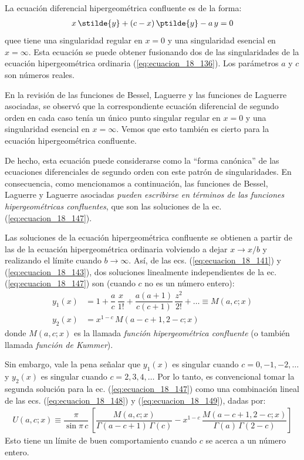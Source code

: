 La ecuación diferencial hipergeométrica confluente es de la forma:
\begin{align}
x \, \stilde{y} + (c - x) \, \ptilde{y} - a \, y = 0
\label{eq:ecuacion_18_147}
\end{align}
quee tiene una singularidad regular en $x = 0$ y una singularidad esencial en $x = \infty$. Esta ecuación se puede obtener fusionando dos de las singularidades de la ecuación hipergeométrica ordinaria (\ref{eq:ecuacion_18_136}). Los parámetros $a$ y $c$ son números reales.
\par
En la revisión de las funciones de Bessel, Laguerre y las funciones de Laguerre asociadas, se observó que la correspondiente ecuación diferencial de segundo orden en cada caso tenía un único punto singular regular en $x = 0$ y una singularidad esencial en $x = \infty$. Vemos que esto también es cierto para la ecuación hipergeométrica confluente.
\par
De hecho, esta ecuación puede considerarse como la \enquote{forma canónica} de las ecuaciones diferenciales de segundo orden con este patrón de singularidades. En consecuencia, como mencionamos a continuación, las funciones de Bessel, Laguerre y Laguerre asociadas \emph{pueden escribirse en términos de las funciones hipergeométricas confluentes}, que son las soluciones de la ec. (\ref{eq:ecuacion_18_147}).
\par
Las soluciones de la ecuación hipergeométrica confluente se obtienen a partir de las de la ecuación hipergeométrica ordinaria volviendo a dejar $x \to x/b$ y realizando el límite cuando $b \to \infty$. Así, de las ecs. (\ref{eq:ecuacion_18_141}) y (\ref{eq:ecuacion_18_143}), dos soluciones linealmente independientes de la ec. (\ref{eq:ecuacion_18_147}) son (cuando $c$ no es un número entero):
\begin{align}
y_{1} (x) &= 1 + \dfrac{a}{c} \, \dfrac{x}{1!} + \dfrac{a (a + 1)}{c (c + 1)} \, \dfrac{z^{2}}{2!} + \ldots \equiv M (a, c; x) \label{eq:ecuacion_18_148} \\[0.5em]
y_{2} (x) &= x^{1-c} \, M(a - c + 1, 2 - c; x) \label{eq:ecuacion_18_149}
\end{align}
donde $M(a, c; x)$ es la llamada \emph{función hipergeométrica confluente} (o también llamada \emph{función de Kummer}).
\par
Sin embargo, vale la pena señalar que $y_{1} (x)$ es singular cuando $c = 0, -1, -2, \ldots$ y $y_{2} (x)$ es singular cuando $c = 2, 3, 4, \ldots$ Por lo tanto, es convencional tomar la segunda solución para la ec. (\ref{eq:ecuacion_18_147}) como una combinación lineal de las ecs. (\ref{eq:ecuacion_18_148}) y (\ref{eq:ecuacion_18_149}), dadas por:
\begin{align*}
U(a, c; x) \equiv \dfrac{\pi}{\sin \pi \, c} \, \left[ \dfrac{M(a, c; x)}{\Gamma (a - c + 1) \, \Gamma (c)} - x^{1-c} \, \dfrac{M(a - c + 1, 2 - c; x)}{\Gamma(a) \, \Gamma (2 - c)} \right]
\end{align*}
Esto tiene un límite de buen comportamiento cuando $c$ se acerca a un número entero.

